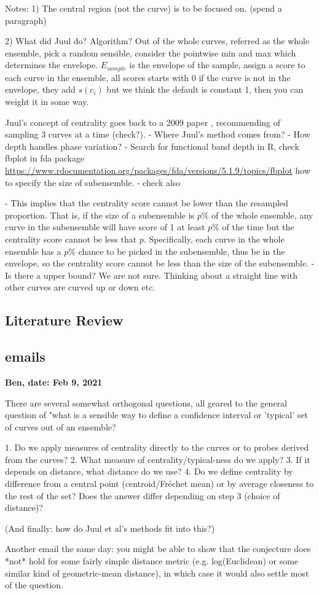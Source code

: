 \documentclass[12pt]{article}
\theoremstyle{definition} %
\begin{document}
Notes:
1) The central region (not the curve) is to be focused on. (spend a paragraph) 

2) What did Juul do? Algorithm? 
Out of the whole curves, referred as the whole ensemble, pick a random sensible, consider the pointwise min and max which determines the envelope. $E_{sample}$ is the envelope of the sample, assign a score to each curve in the ensemble, all scores starts with 0 if the curve is not in the envelope, they add $s(c_i)$ but we think the default is constant 1, then you can weight it in some way. 

Juul's concept of centrality goes back to a 2009 paper \cite{lopez2009concept}, recommending of sampling 3 curves at a time (check?). 
- Where Juul's method comes from?
- How depth handles phase variation?
- Search for functional band depth in R, check fbplot in fda package \url{https://www.rdocumentation.org/packages/fda/versions/5.1.9/topics/fbplot} how to specify the size of subensemble.
- check also \cite{sun2012exact}

- This implies that the centrality score cannot be lower than the resampled proportion. 
That is, if the size of a subensemble is $p\%$ of the whole ensemble, any curve in the subensemble will have score of 1 at least $p\%$ of the time but the centrality score cannot be less that $p$. Specifically, each curve in the whole ensemble has a $p\%$ chance to be picked in the subensemble, thus be in the envelope, so the centrality score cannot be less than the size of the subensemble.     
- Is there a upper bound? We are not sure. Thinking about a straight line with other curves are curved up or down etc.
\subsection{Literature Review}
\citep{juul2021fixed}

\subsection{emails}

{\bf Ben,  
date: Feb 9, 2021}

There are several somewhat orthogonal questions, all geared to the general question of "what is a sensible way to define a confidence interval or 'typical' set of curves out of an ensemble?

 1. Do we apply measures of centrality directly to the curves or to
probes derived from the curves?
 2.  What measure of centrality/typical-ness do we apply?
 3.  If it depends on distance, what distance do we use?
 4. Do we define centrality by difference from a central point
(centroid/Fréchet mean) or by average closeness to the rest of the
set? Does the answer differ depending on step 3 (choice of distance)?

(And finally: how do Juul et al's methods fit into this?)

Another email the same day:
you might be able to show that the conjecture does *not* hold for some fairly simple distance metric (e.g. log(Euclidean) or some similar kind of geometric-mean distance), in which case it would also settle most of the question.
\end{document}
